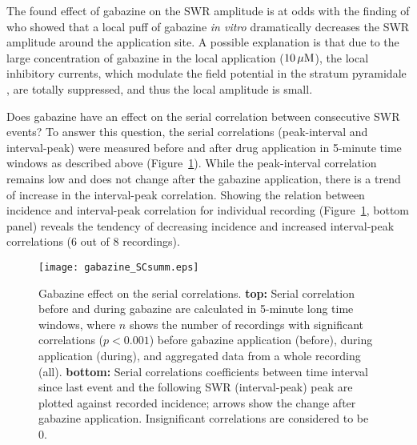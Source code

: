     The found effect of gabazine on the SWR amplitude is at odds with the
    finding of \cite{Schlingloff2014} who showed that a local puff of gabazine
    \textit{in vitro} dramatically decreases the SWR amplitude around the
    application site. A possible explanation is that due to the large
    concentration of gabazine in the local application ($10\,\rm \mu M$), the
    local inhibitory currents, which modulate the field potential in the
    stratum pyramidale \citep{Schonberger2014}, are totally suppressed, and
    thus the local amplitude is small.
    
    Does gabazine have an effect on the serial correlation between consecutive
    SWR events? To answer this question, the serial correlations (peak-interval
    and interval-peak) were measured before and after drug application in
    5-minute time windows as described above
    (Figure~\ref{fig:gabazine_SCsumm}). While the peak-interval correlation
    remains low and does not change after the gabazine application, there is a
    trend of increase in the interval-peak correlation. Showing the relation
    between incidence and interval-peak correlation for individual recording
    (Figure~\ref{fig:gabazine_SCsumm}, bottom panel) reveals the tendency of
    decreasing incidence and increased interval-peak correlations (6 out of 8
    recordings).

    \begin{figure}
      \center
      \texttt{[image: gabazine\_SCsumm.eps]}
      \caption{
        Gabazine effect on the serial correlations. \textbf{top:} Serial
        correlation before and during gabazine are calculated in 5-minute long
        time windows, where $n$ shows the number of recordings with significant
        correlations ($p<0.001$) before gabazine application (before), during
        application (during), and aggregated data from a whole recording (all).
        \textbf{bottom:} Serial correlations coefficients between time interval
        since last event and the following SWR (interval-peak) peak are plotted
        against recorded incidence; arrows show the change after gabazine
        application. Insignificant correlations are considered to be 0.
             }
    \label{fig:gabazine_SCsumm}
    \end{figure}

